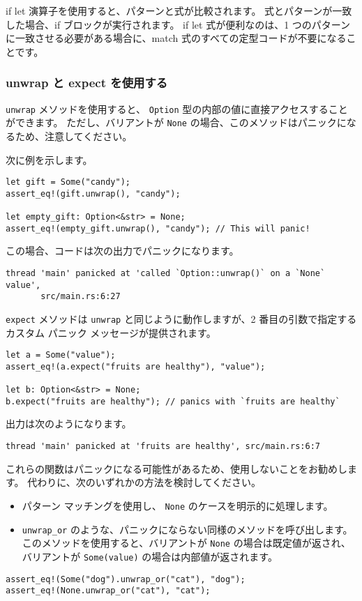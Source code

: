 if let 演算子を使用すると、パターンと式が比較されます。 式とパターンが一致した場合、if ブロックが実行されます。 if let 式が便利なのは、1 つのパターンに一致させる必要がある場合に、match 式のすべての定型コードが不要になることです。

\subsubsection{unwrap と expect を使用する}

\texttt{unwrap} メソッドを使用すると、 \texttt{Option} 型の内部の値に直接アクセスすることができます。 ただし、バリアントが \texttt{None} の場合、このメソッドはパニックになるため、注意してください。

次に例を示します。

\begin{lstlisting}[numbers=none]
let gift = Some("candy");
assert_eq!(gift.unwrap(), "candy");

let empty_gift: Option<&str> = None;
assert_eq!(empty_gift.unwrap(), "candy"); // This will panic!
\end{lstlisting}

この場合、コードは次の出力でパニックになります。

\begin{lstlisting}[numbers=none]
    thread 'main' panicked at 'called `Option::unwrap()` on a `None` value',
       src/main.rs:6:27
\end{lstlisting}

\texttt{expect} メソッドは \texttt{unwrap} と同じように動作しますが、2 番目の引数で指定するカスタム パニック メッセージが提供されます。

\begin{lstlisting}[numbers=none]
let a = Some("value");
assert_eq!(a.expect("fruits are healthy"), "value");

let b: Option<&str> = None;
b.expect("fruits are healthy"); // panics with `fruits are healthy`
\end{lstlisting}

出力は次のようになります。

\begin{lstlisting}[numbers=none]
    thread 'main' panicked at 'fruits are healthy', src/main.rs:6:7
\end{lstlisting}

これらの関数はパニックになる可能性があるため、使用しないことをお勧めします。 代わりに、次のいずれかの方法を検討してください。

\begin{itemize}
\item パターン マッチングを使用し、 \texttt{None} のケースを明示的に処理します。
\item \texttt{unwrap\_or} のような、パニックにならない同様のメソッドを呼び出します。このメソッドを使用すると、バリアントが \texttt{None} の場合は既定値が返され、バリアントが \texttt{Some(value)} の場合は内部値が返されます。    
\end{itemize}

\begin{lstlisting}[numbers=none]
assert_eq!(Some("dog").unwrap_or("cat"), "dog");
assert_eq!(None.unwrap_or("cat"), "cat");
\end{lstlisting}






